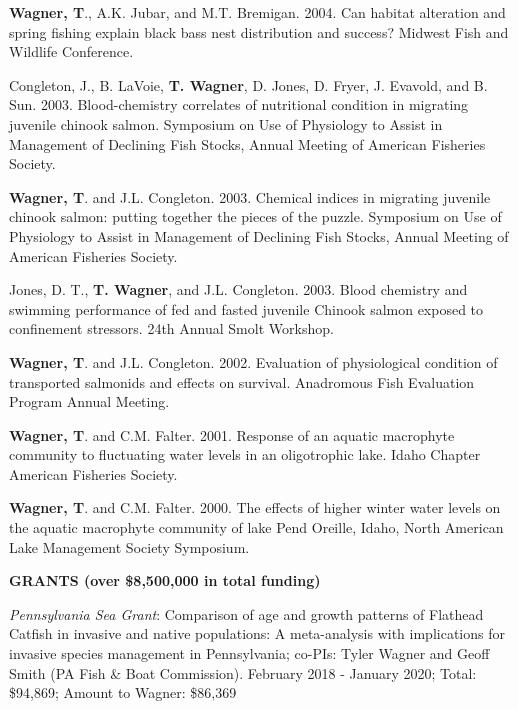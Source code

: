 \documentclass[10pt]{article}
\begin{document}
\begin{flushleft}
\begin{etaremune}
\item {\bf Wagner, T}., A.K. Jubar, and M.T. Bremigan. 2004. Can habitat alteration and spring fishing explain black bass nest distribution and success? Midwest Fish and Wildlife Conference.


\item Congleton, J., B. LaVoie, {\bf T. Wagner}, D. Jones, D. Fryer, J. Evavold, and B. Sun. 2003. Blood-chemistry correlates of nutritional condition in migrating juvenile chinook salmon. Symposium on Use of Physiology to Assist in Management of Declining Fish Stocks, Annual Meeting of American Fisheries Society.

\item {\bf Wagner, T}. and J.L. Congleton. 2003. Chemical indices in migrating juvenile chinook salmon: putting together the pieces of the puzzle. Symposium on Use of Physiology to Assist in Management of Declining Fish Stocks, Annual Meeting of American Fisheries Society.

\item Jones, D. T., {\bf T. Wagner}, and J.L. Congleton. 2003. Blood chemistry and swimming performance of fed and fasted juvenile Chinook salmon exposed to confinement stressors. 24th Annual Smolt Workshop.


\item {\bf Wagner, T}. and J.L. Congleton. 2002. Evaluation of physiological condition of transported salmonids and effects on survival. Anadromous Fish Evaluation Program Annual Meeting.


\item {\bf Wagner, T}. and C.M. Falter. 2001. Response of an aquatic macrophyte community to fluctuating water levels in an oligotrophic lake. Idaho Chapter American Fisheries Society.


\item {\bf Wagner, T}. and C.M. Falter. 2000. The effects of higher winter water levels on the aquatic macrophyte community of lake Pend Oreille, Idaho, North American Lake Management Society Symposium.


\end{etaremune}

\centerline {\bf{GRANTS (over \$8,500,000 in total funding)}}
\vspace{5pt}
\begin{etaremune}
\item {\sl Pennsylvania Sea Grant}: Comparison of age and growth patterns of Flathead Catfish in invasive and native populations: A meta-analysis with implications for invasive species management in Pennsylvania; co-PIs: Tyler Wagner and Geoff Smith (PA Fish \& Boat Commission). February 2018 - January 2020; Total: \$94,869;  Amount to Wagner: \$86,369


\end{etaremune}
\end{flushleft}
\end{document}

